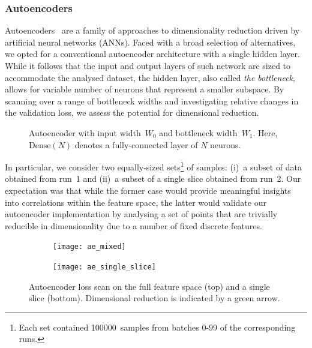 \subsubsection{Autoencoders}

Autoencoders~\cite{SCHMIDHUBER201585} are a family of approaches to
dimensionality reduction driven by artificial neural
networks (ANNs). Faced with a broad selection of alternatives, we opted for a
conventional autoencoder architecture with a single hidden layer. While it
follows that the input and output layers of such
network are sized to accommodate the analysed dataset, the
hidden layer, also called \textit{the bottleneck}, allows for variable number of
neurons that represent a smaller subspace. By scanning
over a range of bottleneck widths and investigating relative changes in the
validation loss, we assess the potential for dimensional reduction.

\begin{figure}
	\centering
	{\footnotesize {}}
	\caption{Autoencoder with input width~$W_0$ and bottleneck width~$W_1$.
	Here, $\text{Dense}(N)$ denotes a fully-connected layer of $N$ neurons.}
	\label{fig:autoencoder}
\end{figure}

In particular, we consider two equally-sized sets\footnote{Each set contained
\num{100000}~samples from batches 0-99 of the corresponding runs.} of samples:
(i)~a subset of data obtained
from run~1 and (ii)~a subset of a single slice obtained from run~2. Our
expectation was that while the former case would provide meaningful insights into
correlations within the feature space, the latter would validate our
autoencoder implementation by analysing a set of points that are trivially
reducible in dimensionality due to a number of fixed discrete features.

\begin{figure}
	\centering
	\vspace{-4ex}

	\begin{subfigure}[b]{\linewidth}
		\texttt{[image: ae\_mixed]}
	\end{subfigure}

	\vspace{-0.2ex}

	\begin{subfigure}[b]{\linewidth}
		\texttt{[image: ae\_single\_slice]}
	\end{subfigure}

	\caption{Autoencoder loss scan on the full feature space (top) and a single slice
		(bottom). Dimensional reduction is indicated by a green arrow.}
	\label{fig:autoencoder-loss}
\end{figure}

